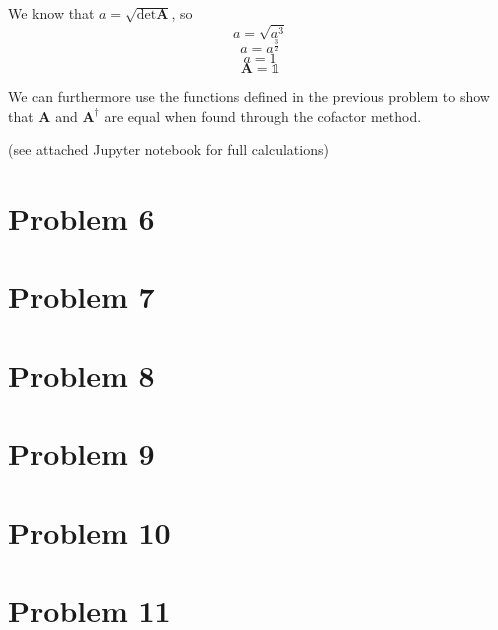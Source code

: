 \documentclass{article}
\begin{document}
We know that $a = \sqrt{\det{\textbf{A}}}$, so
$$ a = \sqrt{a^3} $$
$$ a = a^{\frac{3}{2}} $$
$$ a = 1 $$
$$\boxed{ \textbf{A} = \mathbb{1} }$$

We can furthermore use the functions defined in the previous problem to show that $\textbf{A}$ and  $\textbf{A}^{\dagger}$ are equal when found through the cofactor method.

(see attached Jupyter notebook for full calculations)




\section*{Problem 6}





\section*{Problem 7}





\section*{Problem 8}





\section*{Problem 9}





\section*{Problem 10}





\section*{Problem 11}






\end{document}
